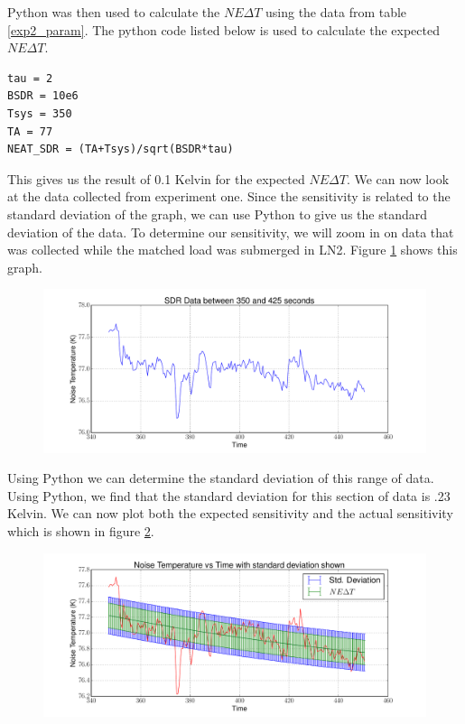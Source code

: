 {Python was then used to calculate the $NE\Delta T$ using the data from table \ref{exp2_param}.  The python code listed below is used to calculate the expected $NE\Delta T$.

\begin{lstlisting}[frame=single,keywordstyle=\color{blue}]
tau = 2
BSDR = 10e6
Tsys = 350
TA = 77
NEAT_SDR = (TA+Tsys)/sqrt(BSDR*tau)
\end{lstlisting}

This gives us the result of 0.1 Kelvin for the expected $NE\Delta T$.  We can now look at the data collected from experiment one.  Since the sensitivity is related to the standard deviation of the graph, we can use Python to give us the standard deviation of the data.  To determine our sensitivity, we will zoom in on data that was collected while the matched load was submerged in LN2.  Figure \ref{Sensitivity} shows this graph.  

\begin{figure}[h!tb] \centering
\includegraphics[width=\textwidth]{Experiments/Exp1/SDR_Zoom.pdf}
\label{Sensitivity}
\end{figure}

Using Python we can determine the standard deviation of this range of data.  Using Python, we find that the standard deviation for this section of data is .23 Kelvin.  We can now plot both the expected sensitivity and the actual sensitivity which is shown in figure \ref{sensitivity_exp_real}.

\begin{figure}[h!tb] \centering
\includegraphics[width=\textwidth]{Experiments/Exp1/std_dev_errbar.pdf}
\label{sensitivity_exp_real}
\end{figure}

}

